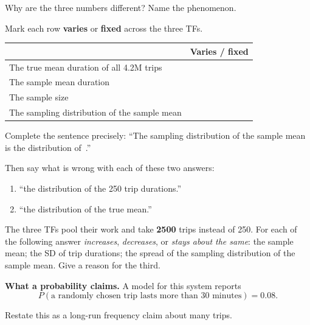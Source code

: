 \documentclass[11pt]{article}
\newcommand{\blankline}[1]{\underline{\hspace{#1}}}
\newcommand{\answerspace}[1]{\vspace{#1}}
\begin{document}
\begin{questions}
\begin{parts}
\item Why are the three numbers different? Name the phenomenon.
\answerspace{3em}

\item Mark each row \textbf{varies} or \textbf{fixed} across the three TFs.

\begin{center}
\renewcommand{\arraystretch}{1.6}
\begin{tabularx}{\linewidth}{Lc}
\toprule
 & \textbf{Varies / fixed} \\
\midrule
The true mean duration of all 4.2M trips & \\
The sample mean duration & \\
The sample size & \\
The sampling distribution of the sample mean & \\
\bottomrule
\end{tabularx}
\end{center}

\item Complete the sentence precisely: ``The sampling distribution of the sample mean is the
distribution of \blankline{2.7in}\,.''

Then say what is wrong with each of these two answers:
\begin{enumerate}[label=\arabic*., leftmargin=1.8em, itemsep=.15em, topsep=.3em]
\item ``the distribution of the 250 trip durations.''
\item ``the distribution of the true mean.''
\end{enumerate}
\answerspace{5em}

\item The three TFs pool their work and take \textbf{2500} trips instead of 250. For each of the
following answer \emph{increases}, \emph{decreases}, or \emph{stays about the same}: the sample
mean; the SD of trip durations; the spread of the sampling distribution of the sample mean. Give
a reason for the third.
\answerspace{5em}
\end{parts}

\item \textbf{What a probability claims.} A model for this system reports
\[
P(\text{a randomly chosen trip lasts more than 30 minutes}) = 0.08 .
\]

\begin{parts}
\item Restate this as a long-run frequency claim about many trips.
\answerspace{3em}


\end{parts}
\end{questions}
\end{document}
